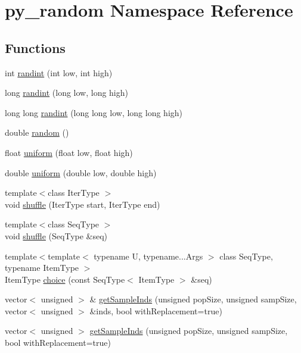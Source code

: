 \hypertarget{namespacepy__random}{\section{py\-\_\-random Namespace Reference}
\label{namespacepy__random}
}
\subsection*{Functions}
\begin{DoxyCompactItemize}
\item 
int \hyperlink{namespacepy__random_ac21b34e4e56b3863dcdd3bfef24d4319}{randint} (int low, int high)
\item 
long \hyperlink{namespacepy__random_ab2d98a941b012d2e2aa47ce70a6d7e51}{randint} (long low, long high)
\item 
long long \hyperlink{namespacepy__random_a0f224448fbf742639f2eba6e9576c2a2}{randint} (long long low, long long high)
\item 
double \hyperlink{namespacepy__random_a7dde5bdd031aa6ec9b3179dda0e7e56d}{random} ()
\item 
float \hyperlink{namespacepy__random_a1462ed7b909fb4f5b29934b683cc9889}{uniform} (float low, float high)
\item 
double \hyperlink{namespacepy__random_aab2ed6628e9e0cabbbb83d95c7599f6d}{uniform} (double low, double high)
\item 
{\footnotesize template$<$class Iter\-Type $>$ }\\void \hyperlink{namespacepy__random_a7b7c1282dbbc2850b8b723dab3b23691}{shuffle} (Iter\-Type start, Iter\-Type end)
\item 
{\footnotesize template$<$class Seq\-Type $>$ }\\void \hyperlink{namespacepy__random_ab66bcc464baa50ad98112eb5c2df8c86}{shuffle} (Seq\-Type \&seq)
\item 
{\footnotesize template$<$template$<$ typename U, typename...\-Args $>$ class Seq\-Type, typename Item\-Type $>$ }\\Item\-Type \hyperlink{namespacepy__random_ae50e828bedece790b2631f461ef136e2}{choice} (const Seq\-Type$<$ Item\-Type $>$ \&seq)
\item 
vector$<$ unsigned $>$ \& \hyperlink{namespacepy__random_ae9e440ebbc147a12da87b7beb6b9a749}{get\-Sample\-Inds} (unsigned pop\-Size, unsigned samp\-Size, vector$<$ unsigned $>$ \&inds, bool with\-Replacement=true)
\item 
vector$<$ unsigned $>$ \hyperlink{namespacepy__random_a487a3de2095347f5759d88b64673ba24}{get\-Sample\-Inds} (unsigned pop\-Size, unsigned samp\-Size, bool with\-Replacement=true)

\end{DoxyCompactItemize}
